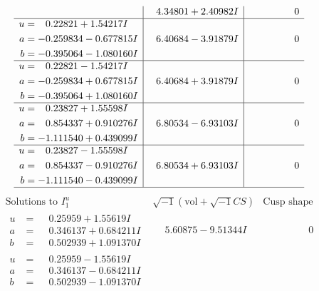 \documentclass[1p]{elsarticle_modified}
\theoremstyle{definition}
\newcommand{\I}{\sqrt{-1}}
\begin{document}
$$\begin{array}{c|c|c}
 & \phantom{-}4.34801 + 2.40982 I & \phantom{-0.000000 } 0 \\ \hline\begin{aligned}
u &= \phantom{-}0.22821 + 1.54217 I \\
a &= -0.259834 - 0.677815 I \\
b &= -0.395064 - 1.080160 I\end{aligned}
 & \phantom{-}6.40684 - 3.91879 I & \phantom{-0.000000 } 0 \\ \hline\begin{aligned}
u &= \phantom{-}0.22821 - 1.54217 I \\
a &= -0.259834 + 0.677815 I \\
b &= -0.395064 + 1.080160 I\end{aligned}
 & \phantom{-}6.40684 + 3.91879 I & \phantom{-0.000000 } 0 \\ \hline\begin{aligned}
u &= \phantom{-}0.23827 + 1.55598 I \\
a &= \phantom{-}0.854337 + 0.910276 I \\
b &= -1.111540 + 0.439099 I\end{aligned}
 & \phantom{-}6.80534 - 6.93103 I & \phantom{-0.000000 } 0 \\ \hline\begin{aligned}
u &= \phantom{-}0.23827 - 1.55598 I \\
a &= \phantom{-}0.854337 - 0.910276 I \\
b &= -1.111540 - 0.439099 I\end{aligned}
 & \phantom{-}6.80534 + 6.93103 I & \phantom{-0.000000 } 0\\
 \hline 
 \end{array}$$\newpage$$\begin{array}{c|c|c}  
\text{Solutions to }I^u_{1}& \I (\text{vol} + \sqrt{-1}CS) & \text{Cusp shape}\\
 \hline 
\begin{aligned}
u &= \phantom{-}0.25959 + 1.55619 I \\
a &= \phantom{-}0.346137 + 0.684211 I \\
b &= \phantom{-}0.502939 + 1.091370 I\end{aligned}
 & \phantom{-}5.60875 - 9.51344 I & \phantom{-0.000000 } 0 \\ \hline\begin{aligned}
u &= \phantom{-}0.25959 - 1.55619 I \\
a &= \phantom{-}0.346137 - 0.684211 I \\
b &= \phantom{-}0.502939 - 1.091370 I\end{aligned}

\end{array}$$
\end{document}

